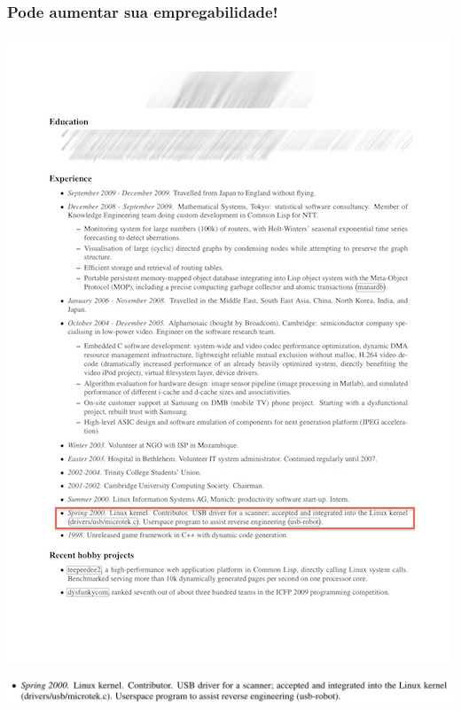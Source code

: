 \documentclass[xcolor=dvipsnames]{beamer}
\begin{document}
\begin{frame}
	\frametitle{Pode aumentar sua empregabilidade!}
 	\includegraphics[scale=0.75]{example_CV2.jpg}
\end{frame}

\begin{frame}
 	\includegraphics[scale=0.30]{contrib.jpg}
\end{frame}

\end{document}
